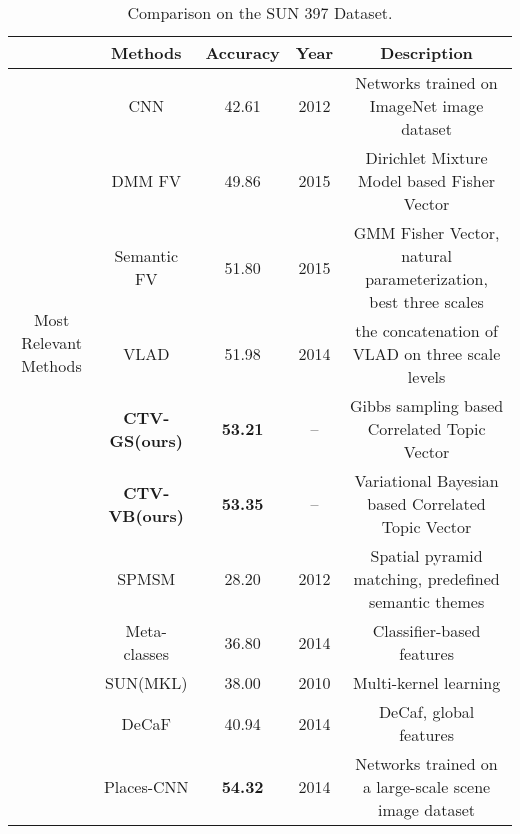 \documentclass[journal]{IEEEtran}
\begin{document}
\begin{table*}[!t]
\centering
\caption{Comparison on the SUN 397 Dataset.}
\label{Table:result-SUN397}
    \begin{tabular}{c|c|c|c|c}
    \hline
    \multirow{1}{2cm}{} & \multirow{1}{2cm}{Methods} & \multirow{1}{2cm}{Accuracy} & \multirow{1}{1cm}{Year} & \multicolumn{1}{c}{Description} \\
    \hline
    \hline
    \multirow{7}[-1]{2cm}{Most Relevant Methods}
        & CNN\cite{zhou2014learning}               & 42.61           & 2012 & Networks trained on ImageNet image dataset \\
        & DMM FV\cite{dixit2015scene}              & 49.86           & 2015 & Dirichlet Mixture Model based Fisher Vector \\
        & Semantic FV\cite{dixit2015scene}         & 51.80            & 2015 & GMM Fisher Vector, natural parameterization, best three scales \\
        & VLAD\cite{gong2014multi}                 & 51.98           & 2014 & the concatenation of VLAD on three scale levels \\
        & \textbf{CTV-GS(ours)}                    & \textbf{53.21}  & --   & Gibbs sampling based Correlated Topic Vector \\
        & \textbf{CTV-VB(ours)}                    & \textbf{53.35}  & --   & Variational Bayesian based Correlated Topic Vector \\
    \hline
    \multirow{6}{2cm}{Other State-of-the-art Methods}
        & SPMSM\cite{kwitt2012scene}               & 28.20             & 2012 & Spatial pyramid matching, predefined semantic themes\\
        & Meta-classes\cite{bergamo2014classemes}  & 36.80             & 2014 & Classifier-based features \\
        & SUN(MKL)\cite{xiao2010sun}               & 38.00             & 2010 & Multi-kernel learning \\
        & DeCaF\cite{donahue2013decaf}             & 40.94            & 2014 & DeCaf, global features \\
        & Places-CNN\cite{zhou2014learning}        & \textbf{54.32}   & 2014 & Networks trained on a large-scale scene image dataset \\
    \hline\hline
\end{tabular} \end{table*}
\end{document}
